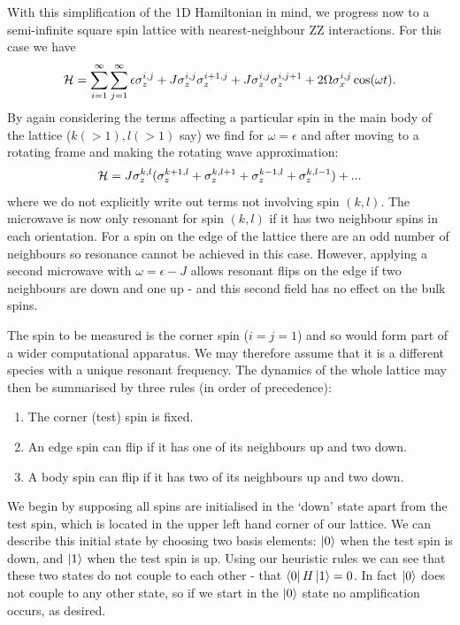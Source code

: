 With this simplification of the 1D Hamiltonian in mind, we progress now to a semi-infinite square spin lattice with nearest-neighbour ZZ interactions. For this case we have
\begin{equation} {\cal H} = \sum_{i=1}^{\infty}\sum_{j=1}^\infty
  \epsilon \sigma^{i, j}_z + J \sigma_z^{i, j}\sigma_z^{i+1, j} +
  J\sigma_z^{i, j}\sigma_z^{i, j+1} + 2 \Omega \sigma_x^{i, j}
  \cos(\omega t).
\end{equation}
By again considering the terms affecting a particular spin in the main body of the lattice ($k(>1), l(>1)$ say) we find for $\omega = \epsilon$ and after moving to a rotating frame and making the rotating wave approximation:
\begin{equation}
  {\cal H} = J \sigma_z^{k, l} (\sigma_z^{k+1, l} + \sigma_z^{k, l+1} + \sigma_z^{k-1, l} + \sigma_z^{k, l-1}) +...
\end{equation}
where we do not explicitly write out terms not involving spin $(k, l)$.  The microwave is now only resonant for spin $(k, l)$ if it has two neighbour spins in each orientation. For a spin on the edge of the lattice there are an odd number of neighbours so resonance cannot be achieved in this case. However, applying a second microwave with $\omega = \epsilon - J$ allows resonant flips on the edge if two neighbours are down and one up - and this second field has no effect on the bulk spins.

The spin to be measured is the corner spin ($i=j=1$) and so would form part of a wider computational apparatus. We may therefore assume that it is a different species with a unique resonant frequency. The dynamics of the whole lattice may then be summarised by three rules (in order of precedence):
\begin{enumerate}
  \item The corner (test) spin is fixed.\vspace{-0.2cm}
  \item An edge spin can flip if it has one of its neighbours up and
    two down.\vspace{-0.2cm}
  \item A body spin can flip if it has two of its neighbours up and two down.\vspace{-0.2cm}
\end{enumerate}
We begin by supposing all spins are initialised in the `down' state apart from the test spin, which is located in the upper left hand corner of our lattice. We can describe this initial state by choosing two basis elements: $\left\vert0\right\rangle$ when the test spin is down, and $\left\vert1\right\rangle$ when the test spin is up. Using our heuristic rules we can see that these two states do not couple to each other - that $\left\langle 0\right\vert H\left\vert1\right\rangle=0$. In fact $\left\vert0\right\rangle$ does not couple to any other state, so if we start in the $\left\vert0\right\rangle$ state no amplification occurs, as desired.


